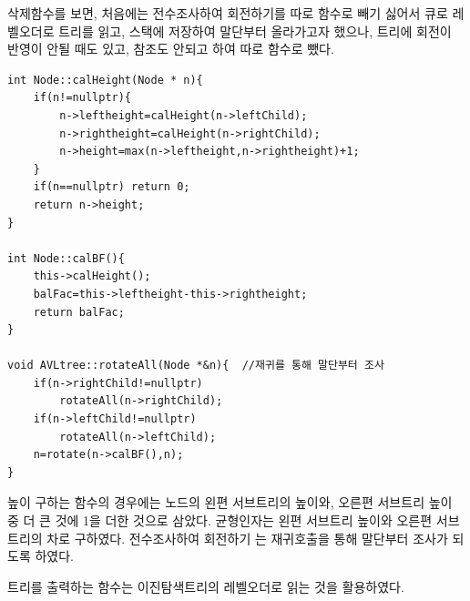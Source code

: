 \documentclass[a4paper,11pt]{article}
\begin{document}
삭제함수를 보면, 처음에는 전수조사하여 회전하기를 따로 함수로 빼기 싫어서 큐로 레벨오더로 트리를 읽고, 스택에 저장하여 말단부터 올라가고자 했으나, 트리에 회전이 반영이 안될 때도 있고, 참조도 안되고 하여 따로 함수로 뺐다.
\begin{Verbatim}
int Node::calHeight(Node * n){
    if(n!=nullptr){
        n->leftheight=calHeight(n->leftChild);
        n->rightheight=calHeight(n->rightChild);
        n->height=max(n->leftheight,n->rightheight)+1;
    }
    if(n==nullptr) return 0;
    return n->height;
}

int Node::calBF(){
    this->calHeight();
    balFac=this->leftheight-this->rightheight;
    return balFac;
}

void AVLtree::rotateAll(Node *&n){ 	//재귀를 통해 말단부터 조사
    if(n->rightChild!=nullptr)
        rotateAll(n->rightChild);
    if(n->leftChild!=nullptr)    
        rotateAll(n->leftChild);
    n=rotate(n->calBF(),n);
}
\end{Verbatim}

높이 구하는 함수의 경우에는 노드의 왼편 서브트리의 높이와, 오른편 서브트리 높이 중 더 큰 것에 1을 더한 것으로 삼았다. 균형인자는 왼편 서브트리 높이와 오른편 서브트리의 차로 구하였다. 전수조사하여 회전하기 는 재귀호출을 통해 말단부터 조사가 되도록 하였다.

트리를 출력하는 함수는 이진탐색트리의 레벨오더로 읽는 것을 활용하였다.
\end{document}
